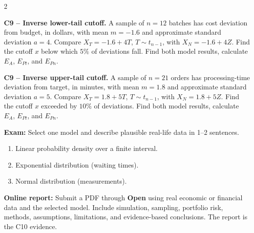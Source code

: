 \begin{multicols}{2}
\noindent\begin{minipage}{\linewidth}
\textbf{C9 -- Inverse lower-tail cutoff.} A sample of $n=12$ batches has cost deviation from budget, in dollars, with mean $m=-1.6$ and approximate standard deviation $a=4$. Compare $X_T=-1.6+4T$, $T\sim t_{n-1}$, with $X_N=-1.6+4Z$.
Find the cutoff $x$ below which $5\%$ of deviations fall. Find both model results, calculate $E_A$, $E_{Pt}$, and $E_{Pn}$. 
\end{minipage}\par

\noindent\begin{minipage}{\linewidth}
\textbf{C9 -- Inverse upper-tail cutoff.} A sample of $n=21$ orders has processing-time deviation from target, in minutes, with mean $m=1.8$ and approximate standard deviation $a=5$. Compare $X_T=1.8+5T$, $T\sim t_{n-1}$, with $X_N=1.8+5Z$.
Find the cutoff $x$ exceeded by $10\%$ of deviations. Find both model results, calculate $E_A$, $E_{Pt}$, and $E_{Pn}$. 
\end{minipage}\par

\textbf{Exam:} Select one model and describe plausible real-life data in 1--2 sentences. 
\begin{enumerate}[label=\textbf{(\alph*)},leftmargin=*]
	\item Linear probability density over a finite interval.
	\item Exponential distribution (waiting times).
	\item Normal distribution (measurements).
\end{enumerate}

\textbf{Online report:} Submit a PDF through \textbf{Open} using real economic or financial data and the selected model. Include simulation, sampling, portfolio risk, methods, assumptions, limitations, and evidence-based conclusions. The report is the C10 evidence.

\end{multicols}

